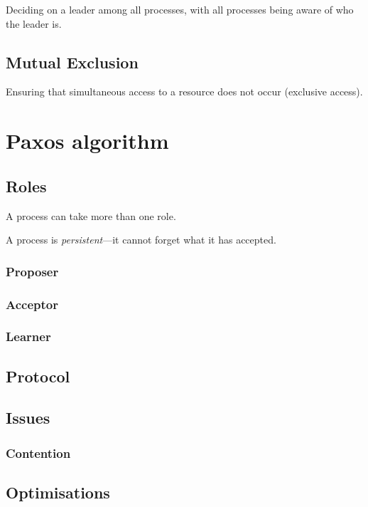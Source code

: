 \documentclass[12pt, a4paper]{article}
\begin{document}
Deciding on a leader among all processes, with all processes being aware of
who the leader is.

\subsection{Mutual Exclusion}

Ensuring that simultaneous access to a resource does not occur (exclusive
access).


\section{Paxos algorithm}

\subsection{Roles}

A process can take more than one role.

A process is \textit{persistent}---it cannot forget what it has accepted.

  \subsubsection{Proposer}

  \subsubsection{Acceptor}

  \subsubsection{Learner}

\subsection{Protocol}

\subsection{Issues}

  \subsubsection{Contention}

\subsection{Optimisations}
\end{document}
